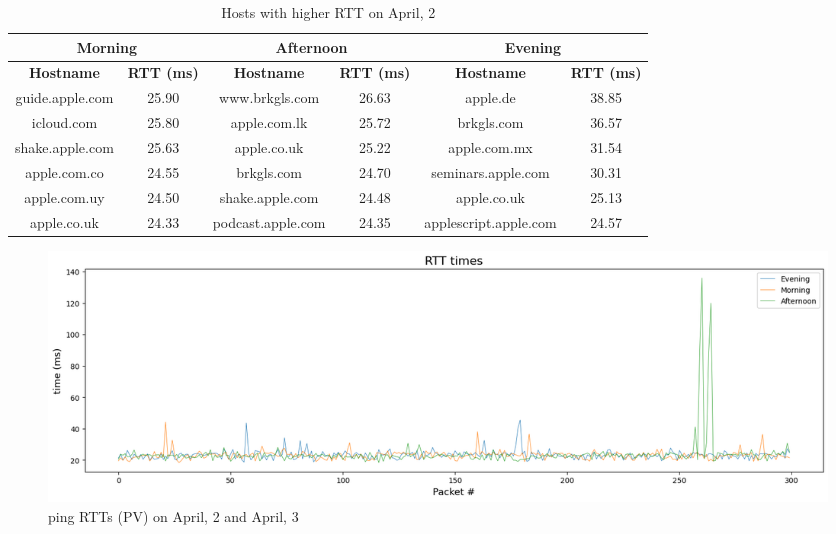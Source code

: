 \documentclass[a4paper,10pt]{article}
\begin{document}
        \begin{table}[h]
                \centering
                \caption{\small Hosts with higher RTT on April, 2}
                \vspace{0.3cm}
                \begin{tabular}{|c|c|c|c|c|c|} \hline
                \multicolumn{2}{|c|}{\textbf{Morning}}  & \multicolumn{2}{|c|}{\textbf{Afternoon}} & \multicolumn{2}{|c|}{\textbf{Evening}} \\ \hline
                \textbf{Hostname} & \textbf{RTT (ms)} & \textbf{Hostname} & \textbf{RTT (ms)} & \textbf{Hostname} & \textbf{RTT (ms)}\\ \hline
                guide.apple.com & 25.90 & www.brkgls.com & 26.63 & apple.de & 38.85\\ \hline
                icloud.com & 25.80 & apple.com.lk & 25.72 & brkgls.com & 36.57\\ \hline
                shake.apple.com & 25.63 & apple.co.uk & 25.22 & apple.com.mx & 31.54\\ \hline
                apple.com.co & 24.55 & brkgls.com & 24.70 & seminars.apple.com & 30.31\\ \hline
                apple.com.uy & 24.50 & shake.apple.com & 24.48 & apple.co.uk & 25.13\\ \hline
                apple.co.uk & 24.33 & podcast.apple.com	 & 24.35 & applescript.apple.com & 24.57\\ \hline
                \end{tabular}
                \label{tab:apple-websites-rtt}
        \end{table}

\begin{multicols}{2} 

\end{multicols}

        \begin{figure}[h]
                \centering
                \includegraphics[width=1\textwidth]{time_RTT_hours_april_2.png}
                \caption{\small ping RTTs (PV) on April, 2 and April, 3}
                \label{fig:RTTs_PV}
        \end{figure}
\end{document}
